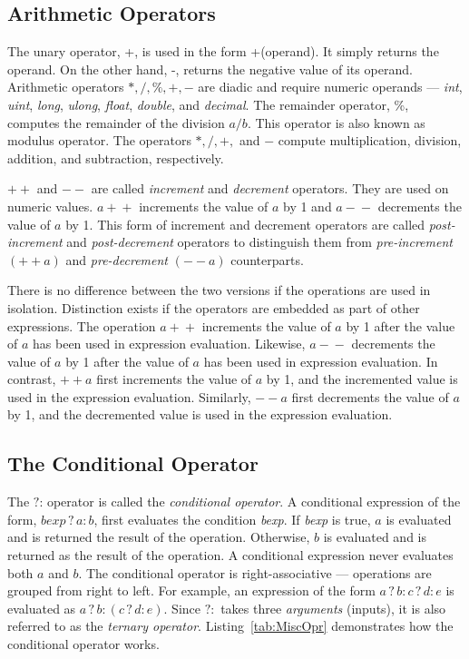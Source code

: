 \subsection{Arithmetic Operators}


The unary operator, +, is used in the form +(operand). It simply
returns the operand. On the other hand, -, returns the negative
value of its operand. Arithmetic operators $\ast, /, \%, +, -$ are
diadic and require numeric operands --- \emph{int}, \emph{uint},
\emph{long}, \emph{ulong}, \emph{float}, \emph{double}, and
\emph{decimal}. The remainder operator, \%, computes the remainder
of the division $a / b$. This operator is also known as modulus
operator. The operators $\ast, /, +,$ and $-$ compute
multiplication, division, addition, and subtraction, respectively.


$+ +$ and $- -$ are called \emph{increment} and \emph{decrement}
operators. They are used on numeric values. $a\!+\!+$ increments
the value of $a$ by 1 and  $a\!\!-\!-$ decrements the value of $a$
by 1. This form of increment and decrement operators are called
\emph{post-increment} and \emph{post-decrement} operators to
distinguish them from \emph{pre-increment} $(+\!+\!a)$ and
\emph{pre-decrement} $(-\!-\!a)$ counterparts.

There is no difference between the two versions if the operations
are used in isolation. Distinction exists if the operators are
embedded as part of other expressions. The operation $a\!+\!+$
increments the value of $a$ by 1 after the value of $a$ has been
used in expression evaluation. Likewise, $a\!-\!-$ decrements the
value of $a$ by 1 after the value of $a$ has been used in
expression evaluation. In contrast, $+\!+\!a$ first increments the
value of $a$ by 1, and the incremented value is used in the
expression evaluation. Similarly, $-\!-\!a$ first decrements the
value of $a$ by 1, and the decremented value is used in the
expression evaluation.



\subsection{The Conditional Operator}

The $?$: operator is called the \emph{conditional operator}. A
conditional expression of the form, $ bexp \, ? \, a \! \! \! : \!
b$, first evaluates the condition \emph{bexp}. If \emph{bexp} is
true, $a$ is evaluated and is returned the result of the
operation. Otherwise, $b$ is evaluated and is returned as the
result of the operation. A conditional expression never evaluates
both $a$ and $b$. The conditional operator is right-associative
--- operations are grouped from right to left. For example, an
expression of the form $a \,? \, b \! : \! c \,? \, d \! : \! e$
is evaluated as $a \,? \, b \!: \! (c \,? \, d:\! e)$. Since $? \!
\! :$ takes three \emph{arguments} (inputs), it is also referred
to as the \emph{ternary operator}. Listing~\ref{tab:MiscOpr}
demonstrates how the conditional operator works.


